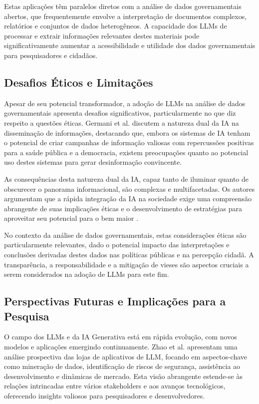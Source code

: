 Estas aplicações têm paralelos diretos com a análise de dados governamentais abertos, que frequentemente envolve a interpretação de documentos complexos, relatórios e conjuntos de dados heterogêneos. A capacidade dos LLMs de processar e extrair informações relevantes destes materiais pode significativamente aumentar a acessibilidade e utilidade dos dados governamentais para pesquisadores e cidadãos.

\subsection{Desafios Éticos e Limitações}

Apesar de seu potencial transformador, a adoção de LLMs na análise de dados governamentais apresenta desafios significativos, particularmente no que diz respeito a questões éticas. Germani et al. \cite{Germani2024} discutem a natureza dual da IA na disseminação de informações, destacando que, embora os sistemas de IA tenham o potencial de criar campanhas de informação valiosas com repercussões positivas para a saúde pública e a democracia, existem preocupações quanto ao potencial uso destes sistemas para gerar desinformação convincente.

As consequências desta natureza dual da IA, capaz tanto de iluminar quanto de obscurecer o panorama informacional, são complexas e multifacetadas. Os autores argumentam que a rápida integração da IA na sociedade exige uma compreensão abrangente de suas implicações éticas e o desenvolvimento de estratégias para aproveitar seu potencial para o bem maior \cite{Germani2024}.

No contexto da análise de dados governamentais, estas considerações éticas são particularmente relevantes, dado o potencial impacto das interpretações e conclusões derivadas destes dados nas políticas públicas e na percepção cidadã. A transparência, a responsabilidade e a mitigação de vieses são aspectos cruciais a serem considerados na adoção de LLMs para este fim.

\subsection{Perspectivas Futuras e Implicações para a Pesquisa}

O campo dos LLMs e da IA Generativa está em rápida evolução, com novos modelos e aplicações emergindo continuamente. Zhao et al. \cite{Zhao2024_04} apresentam uma análise prospectiva das lojas de aplicativos de LLM, focando em aspectos-chave como mineração de dados, identificação de riscos de segurança, assistência ao desenvolvimento e dinâmicas de mercado. Esta visão abrangente estende-se às relações intrincadas entre vários stakeholders e aos avanços tecnológicos, oferecendo insights valiosos para pesquisadores e desenvolvedores.

